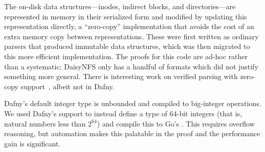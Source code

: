 The on-disk data structures---inodes, indirect blocks, and directories---are
represented in memory in their serialized form and modified by updating this
representation directly, a ``zero-copy'' implementation that avoids the cost of
an extra memory copy between representations. These were first written as
ordinary parsers that produced immutable data structures, which was then
migrated to this more efficient implementation. The proofs for this code are
ad-hoc rather than a systematic; DaisyNFS only has a handful of formats which
did not justify something more general. There is interesting work on
verified parsing with zero-copy support~\cite{swamy:everparse3d}, albeit not in Dafny.

Dafny's default integer type  is unbounded and compiled to big-integer
operations. We used Dafny's
 support to instead define a type of 64-bit integers (that
is, natural numbers less than $2^{64}$) and compile this to Go's .
This requires overflow reasoning, but
automation makes this palatable in the proof and the performance gain is
significant.
